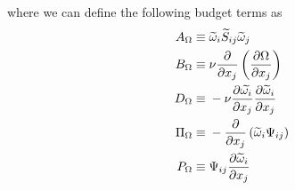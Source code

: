 where we can define the following budget terms as
\begin{subequations}
    \begin{align}
        A_{\Omega} \equiv \; &
            \widetilde{\omega}_{i} \widetilde{S}_{ij} \widetilde{\omega}_{j}\\
        B_{\Omega} \equiv \; &
            \nu \pdv{}{x_{j}} \left( \pdv{\Omega}{x_{j}} \right)\\
        D_{\Omega} \equiv \; &
            -\nu \pdv{\widetilde{\omega_{i}}}{x_{j}}\pdv{\widetilde{\omega}_{i}}{x_{j}}\\
        \Pi_{\Omega} \equiv \; &
            -\pdv{}{x_{j}} \left(\widetilde{\omega}_{i} \Psi_{ij}\right)\\
        P_{\Omega} \equiv \; &
            \Psi_{ij} \pdv{\widetilde{\omega}_{i}}{x_{j}}
    \end{align}
\end{subequations}

